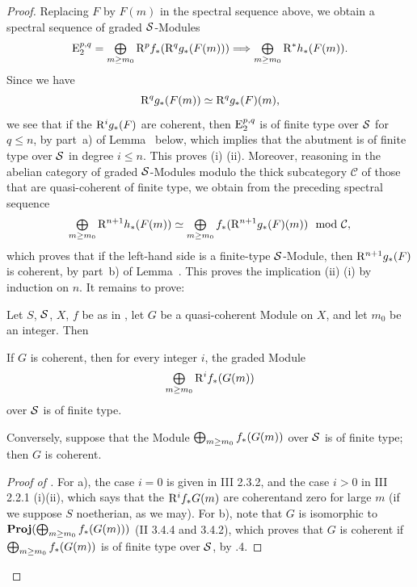 \begin{proof}
Replacing $F$ by $F(m)$ in the spectral sequence above, we
obtain a spectral sequence of graded $\Ss$-Modules\pageoriginale
\[
\E_2^{p, q}= \sisi{\coprod}{\tbigoplus}_{m\geq m_0} \R^pf_\ast(\R^qg_\ast(F(m))\sisi{}{)} \To \sisi{\coprod}{\tbigoplus}_{m\geq m_0} \R^\ast h_\ast(F(m)).
\]
Since we have
\[
\R^qg_\ast(F(m)) \simeq \R^qg_\ast(F) (m),
\]
we see that if the $\R^ig_\ast(F)$ are coherent, then $\E_2^{p, q}$ is of finite type over $\Ss$ for $q\leq n$, by part~a) of Lemma~ below, which implies that the abutment is of finite type over $\Ss$ in degree $i\leq n$. This proves (i) \ALORS (ii). Moreover, reasoning in the abelian category of graded $\Ss$-Modules modulo the thick subcategory $\mathcal{C}$ of those that are quasi-coherent of finite type, we obtain from the preceding spectral sequence
\[
\sisi{\coprod}{\tbigoplus}_{m\geq m_0} \R^{n+1} h_\ast(F(m)) \simeq \sisi{\coprod}{\tbigoplus}_{m\geq m_0} f_\ast (\R^{n+1} g_\ast(F)(m)) \mod \mathcal{C},
\]
which proves that if the left-hand side is a finite-type $\Ss$-Module, then $\R^{n+1} g_\ast(F)$ is coherent, by part~b) of Lemma~. This proves the implication (ii) \ALORS (i) by induction on $n$. It remains to prove:

\begin{lemme} \label{XII.5.3} Let $S$, $\Ss$, $X$, $f$ be as in , let $G$ be a quasi-coherent Module on $X$, and let $m_0$ be an integer. Then
\begin{enumeratea}
\item
If $G$ is coherent, then for every integer $i$, the graded Module
\[
\sisi{\coprod}{\tbigoplus}_{m\geq m_0} \R^i f_\ast(G(m))
\]
over $\Ss$ is of finite type.
\item
Conversely, suppose that the Module $\sisi{\coprod}{\bigoplus}_{m\geq m_0} \sisi{\R^i }{}f_\ast(G(m))$ over $\Ss$ is of finite type; then $G$ is coherent.
\end{enumeratea}
\end{lemme}

\begin{proof}[Proof of ]
For a), the case $i=0$ is given in \EGA III 2.3.2, and the case $i>0$ in \EGA III 2.2.1 (i)(ii), which says that the $ \R^i f_\ast G(m)$ are coherent\pageoriginale and zero for large $m$ (if we suppose $S$ noetherian, as we may). For b), note that $G$ is isomorphic to $\SheafProj (\sisi{\coprod}{\bigoplus}_{m\geq m_0}f_\ast(G(m))\sisi{}{)}$ (\EGA II 3.4.4 and 3.4.2), which proves that $G$ is coherent if $\sisi{\coprod}{\bigoplus}_{m\geq m_0}f_\ast(G(m))$ is of finite type over $\Ss$, by .4.
\skipqed
\end{proof}
\skipqed
\end{proof}

